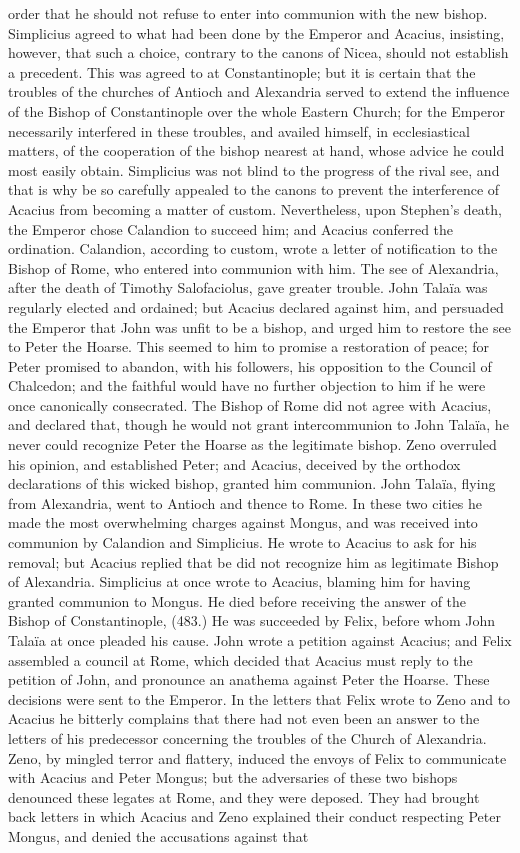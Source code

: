 order that he should not refuse to enter into communion with the new bishop. Simplicius agreed to what had been done by the Emperor and Acacius, insisting, however, that such a choice, contrary to the canons of Nicea, should not establish a precedent. This was agreed to at Constantinople; but it is certain that the troubles of the churches of Antioch and Alexandria served to extend the influence of the Bishop of Constantinople over the whole Eastern Church; for the Emperor necessarily interfered in these troubles, and availed himself, in ecclesiastical matters, of the cooperation of the bishop nearest at hand, whose advice he could most easily obtain. Simplicius was not blind to the progress of the rival see, and that is why be so carefully appealed to the canons to prevent the interference of Acacius from becoming a matter of custom. Nevertheless, upon Stephen's death, the Emperor chose Calandion to succeed him; and Acacius conferred the ordination. Calandion, according to custom, wrote a letter of notification to the Bishop of Rome, who entered into communion with him. The see of Alexandria, after the death of Timothy Salofaciolus, gave greater trouble. John Talaïa was regularly elected and ordained; but Acacius declared against him, and persuaded the Emperor that John was unfit to be a bishop, and urged him to restore the see to Peter the Hoarse. This seemed to him to promise a restoration of peace; for Peter promised to abandon, with his followers, his opposition to the Council of Chalcedon; and the faithful would have no further objection to him if he were once canonically consecrated. The Bishop of Rome did not agree with Acacius, and declared that, though he would not grant intercommunion to John Talaïa, he never could recognize Peter the Hoarse as the legitimate bishop. Zeno overruled his opinion, and established Peter; and Acacius, deceived by the orthodox declarations of this wicked bishop, granted him communion. John Talaïa, flying from Alexandria, went to Antioch and thence to Rome. In these two cities he made the most overwhelming charges against Mongus, and was received into communion by Calandion and Simplicius. He wrote to Acacius to ask for his removal; but Acacius replied that be did not recognize him as legitimate Bishop of Alexandria. Simplicius at once wrote to Acacius, blaming him for having granted communion to Mongus. He died before receiving the answer of the Bishop of Constantinople, (483.) He was succeeded by Felix, before whom John Talaïa at once pleaded his cause. John wrote a petition against Acacius; and Felix assembled a council at Rome, which decided that Acacius must reply to the petition of John, and pronounce an anathema against Peter the Hoarse. These decisions were sent to the Emperor. In the letters that Felix wrote to Zeno and to Acacius he bitterly complains that there had not even been an answer to the letters of his predecessor concerning the troubles of the Church of Alexandria. Zeno, by mingled terror and flattery, induced the envoys of Felix to communicate with Acacius and Peter Mongus; but the adversaries of these two bishops denounced these legates at Rome, and they were deposed. They had brought back letters in which Acacius and Zeno explained their conduct respecting Peter Mongus, and denied the accusations against that 